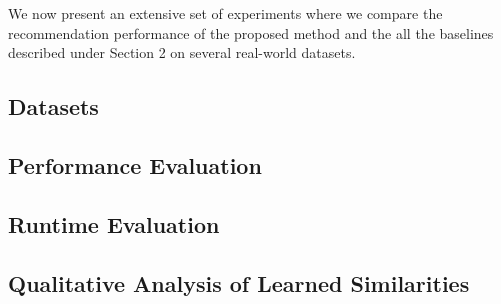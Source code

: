 We now present an extensive set of experiments
where we compare the recommendation performance of the proposed method and the all the baselines described under Section 2 on several real-world datasets.
\subsection{Datasets}


\hspace{-5em}
\subsection{Performance Evaluation}


\subsection{Runtime Evaluation}
\label{section:scalability}


\subsection{Qualitative Analysis of Learned Similarities}

